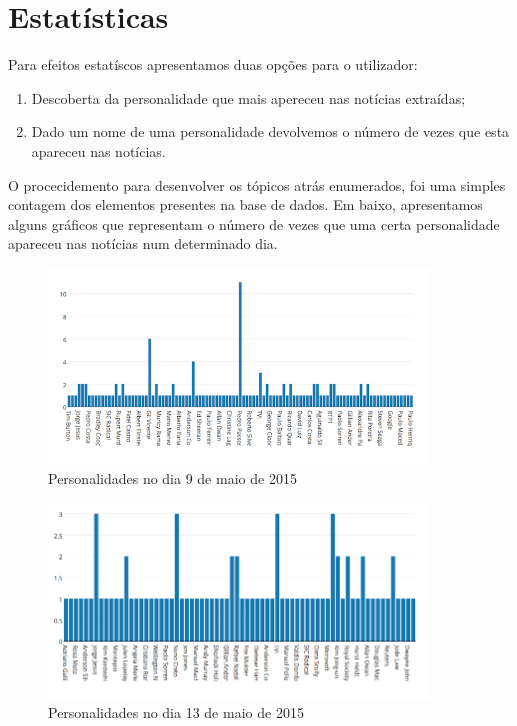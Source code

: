 \section{Estatísticas}

Para efeitos estatíscos apresentamos duas opções para o utilizador:

\begin{enumerate}
  \item Descoberta da personalidade que mais apereceu nas notícias extraídas;
  \item Dado um nome de uma personalidade devolvemos o número de vezes que esta apareceu nas notícias.
\end{enumerate}

O procecidemento para desenvolver os tópicos atrás enumerados, foi uma simples contagem dos elementos presentes na base de dados. Em baixo, apresentamos alguns gráficos que representam o número de vezes que uma certa personalidade apareceu nas notícias num determinado dia.

\begin{figure}[htbp]
  \centering
    \includegraphics[width=0.9\textwidth]{images/day_one.png}
	\caption{Personalidades no dia 9 de maio de 2015}
\end{figure}

\begin{figure}[htbp]
  \centering
    \includegraphics[width=0.9\textwidth]{images/day_two.png}
	\caption{Personalidades no dia 13 de maio de 2015}
\end{figure}

